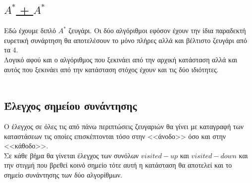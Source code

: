 \documentclass[12pt]{article}
\begin{document}
\subsection*{\underline{$Α^*$ + $Α^*$}}
Εδώ έχουμε διπλό $Α^*$ ζευγάρι. Οι δύο αλγόριθμοι εφόσον έχουν την ίδια παραδεκτή ευρετική συνάρτηση θα αποτελέσουν το μόνο πλήρες αλλά και βέλτιστο ζευγάρι από τα 4.\\
Λογικό αφού και ο αλγόριθμος που ξεκινάει από την αρχική κατάσταση αλλά και αυτός που ξεκινάει από την κατάσταση στόχος έχουν και τις δύο ιδιότητες.\\\\
\subsection*{Έλεγχος σημείου συνάντησης}
Ο έλεγχος σε όλες τις από πάνω περιπτώσεις ζευγαριών θα γίνει με καταγραφή των καταστάσεων τις οποίες επισκέπτονται τόσο στην <<άνοδο>> όσο και στην <<κάθοδο>>.\\
Σε κάθε βήμα θα γίνεται έλεγχος των συνόλων $visited-up$ και $visited-down$ και την στιγμή που βρεθεί κοινό σημείο τότε αυτή η κατάσταση θα αποτελεί και το σημείο συνάντησης των δύο αλγορίθμων.
\end{document}
